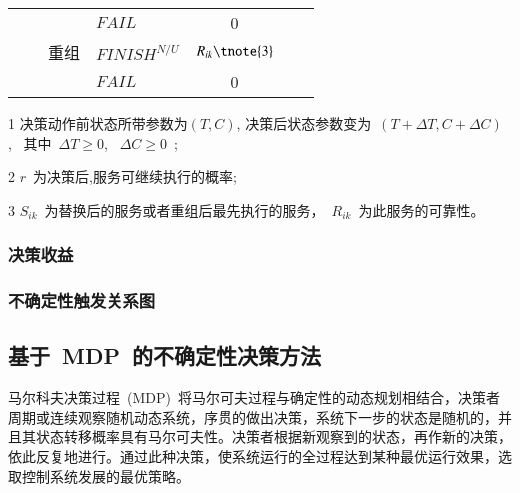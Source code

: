 \begin{table}[htbp]
\begin{threeparttable}
\begin{tabular}{clclccc}
        {}
        & {}
        & {} 
        & {$FAIL$} 
        & {0}
        & {} 
        & {} \\
        
        {}
        & {}
        & {重组} 
        & {$FINISH^{N/U}$} 
        & $R_{ik}\tnote{3}$ 
        & {\multirow{2}{*}{$T_{i0}+\sum\limits_{x = i}^j {({T_{xk}} - {T_{x0}})} $}}
        & {\multirow{2}{*}{$C_{i0}+\sum\limits_{x = i}^j {({C_{xk}} - {C_{x0}})} $}} \\
        
        
        {}
        & {}
        & {} 
        & {$FAIL$} 
        & {0}
        & {} 
        & {} \\

        \bottomrule
    \end{tabular}%
    
    \begin{tablenotes}
        \item[1] 决策动作前状态所带参数为$(T,C)$, 决策后状态参数变为~$(T+\Delta T, C+\Delta C)$,~ 其中~$\Delta T \ge 0$, ~$\Delta C \ge 0$~; 
        \item[2] $r$~为决策后,服务可继续执行的概率;
        \item[3] $S_{ik}$~为替换后的服务或者重组后最先执行的服务，~$R_{ik}$~为此服务的可靠性。
    \end{tablenotes}
\end{threeparttable}
\end{table}%


\subsubsection{决策收益}

\subsubsection{不确定性触发关系图}


\subsection{基于~MDP~的不确定性决策方法}
马尔科夫决策过程~(MDP)~将马尔可夫过程与确定性的动态规划相结合，决策者周期或连续观察随机动态系统，序贯的做出决策，系统下一步的状态是随机的，并且其状态转移概率具有马尔可夫性。决策者根据新观察到的状态，再作新的决策，依此反复地进行。通过此种决策，使系统运行的全过程达到某种最优运行效果，选取控制系统发展的最优策略。

